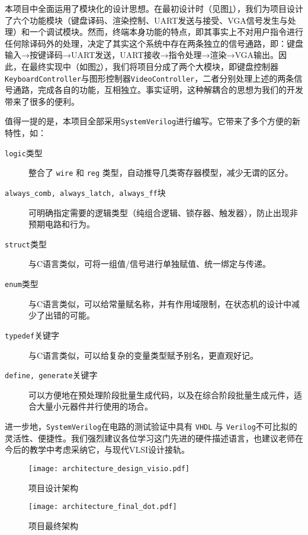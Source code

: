 
本项目中全面运用了模块化的设计思想。在最初设计时（见图\ref{fig:design_architecture}），我们为项目设计了六个功能模块（键盘译码、渲染控制、UART发送与接受、VGA信号发生与处理）和一个调试模块。然而，终端本身功能的特点，即其事实上不对用户指令进行任何除译码外的处理，决定了其实这个系统中存在两条独立的信号通路，即：键盘输入→按键译码→UART发送，UART接收→指令处理→渲染→VGA输出。因此，在最终实现中（如图\ref{fig:final_architecture}），我们将项目分成了两个大模块，即键盘控制器\texttt{KeyboardController}与图形控制器\texttt{VideoController}，二者分别处理上述的两条信号通路，完成各自的功能，互相独立。事实证明，这种解耦合的思想为我们的开发带来了很多的便利。

值得一提的是，本项目全部采用\texttt{SystemVerilog}进行编写。它带来了多个方便的新特性，如：
\begin{description}
  \item[\texttt{logic}类型] 整合了 \texttt{wire} 和 \texttt{reg} 类型，自动推导几类寄存器模型，减少无谓的区分。
  \item[\texttt{always\_comb, always\_latch, always\_ff}块] 可明确指定需要的逻辑类型（纯组合逻辑、锁存器、触发器），防止出现非预期电路和行为。
  \item[\texttt{struct}类型] 与C语言类似，可将一组值/信号进行单独赋值、统一绑定与传递。
  \item[\texttt{enum}类型] 与C语言类似，可以给常量赋名称，并有作用域限制，在状态机的设计中减少了出错的可能。
  \item[\texttt{typedef}关键字] 与C语言类似，可以给复杂的变量类型赋予别名，更直观好记。
  \item[\texttt{define, generate}关键字] 可以方便地在预处理阶段批量生成代码，以及在综合阶段批量生成元件，适合大量小元器件并行使用的场合。
\end{description}

进一步地，\texttt{SystemVerilog}在电路的测试验证中具有 \texttt{VHDL} 与 \texttt{Verilog}不可比拟的灵活性、便捷性。我们强烈建议各位学习这门先进的硬件描述语言，也建议老师在今后的教学中考虑采纳它，与现代VLSI设计接轨。

\begin{figure}[htbp]
\centerline{
\texttt{[image: architecture\_design\_visio.pdf]}
}
\label{fig:design_architecture}
\caption{项目设计架构}
\end{figure}

\begin{figure}[htbp]
\centerline{
\texttt{[image: architecture\_final\_dot.pdf]}
}
\label{fig:final_architecture}
\caption{项目最终架构}
\end{figure}